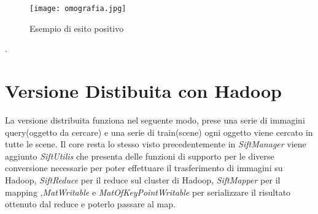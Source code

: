 \begin{itemize}
\begin{figure}[ht]
  \begin{center}
    \texttt{[image: omografia.jpg]}
    \caption{Esempio di esito positivo}
    \label{fig:hom}
    	\end{center}
\end{figure}

\end{itemize}.
\section{Versione Distibuita con Hadoop}
La versione distribuita funziona nel seguente modo, prese una serie di immagini query(oggetto da cercare) e una serie di train(scene) ogni oggetto viene cercato in tutte le scene.
Il core resta lo stesso visto precedentemente in \emph{\textit{SiftManager}} viene aggiunto  \emph{\textit{SiftUtilis}} che presenta delle funzioni di supporto per le diverse conversione necessarie per poter effettuare il trasferimento di immagini su Hadoop, \emph{\textit{SiftReduce}} per il reduce sul cluster di Hadoop, \emph{\textit{SiftMapper}} per il mapping ,\emph{\textit{MatWritable}} e \emph{\textit{MatOfKeyPointWritable}} per serializzare il risultato ottenuto dal reduce e poterlo passare al map.\\
